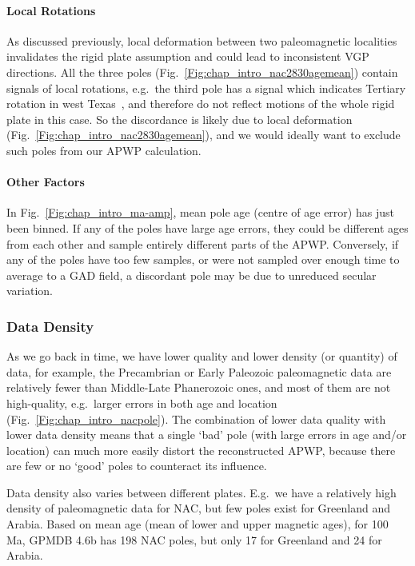 \paragraph{Local Rotations}

As discussed previously, local deformation between two paleomagnetic localities
invalidates the rigid plate assumption and could lead to inconsistent VGP
directions. All the three poles (Fig.~\ref{Fig:chap_intro_nac2830agemean})
contain signals of local rotations, e.g.\ the third pole has a signal which
indicates Tertiary rotation in west Texas~\cite{S92}, and therefore do
not reflect motions of the whole rigid plate in this case. So the discordance
is likely due to local deformation (Fig.~\ref{Fig:chap_intro_nac2830agemean}),
and we would ideally want to exclude such poles from our APWP calculation.

\paragraph{Other Factors}

In Fig.~\ref{Fig:chap_intro_ma-amp}, mean pole age (centre of age error) has just
been binned. If any of the poles have large age errors, they could be different
ages from each other and sample entirely different parts of the APWP\@.
Conversely, if any of the poles have too few samples, or were not sampled over
enough time to average to a GAD field, a discordant pole may be due to
unreduced secular variation.

\subsubsection{Data Density}

As we go back in time, we have lower quality and lower density (or quantity) of
data, for example, the Precambrian or Early Paleozoic paleomagnetic data are
relatively fewer than Middle-Late Phanerozoic ones, and most of them are not
high-quality, e.g.\ larger errors in both age and location
(Fig.~\ref{Fig:chap_intro_nacpole}). The combination of lower data quality with lower data
density means that a single `bad' pole (with large errors in age and/or
location) can much more easily distort the reconstructed APWP, because there
are few or no `good' poles to counteract its influence.

Data density also varies between different plates. E.g.\ we have a relatively
high density of paleomagnetic data for NAC, but few poles exist for Greenland
and Arabia. Based on mean age (mean of lower and upper magnetic ages), for
100 Ma, GPMDB 4.6b has 198 NAC poles, but only 17 for Greenland and
24 for Arabia.


